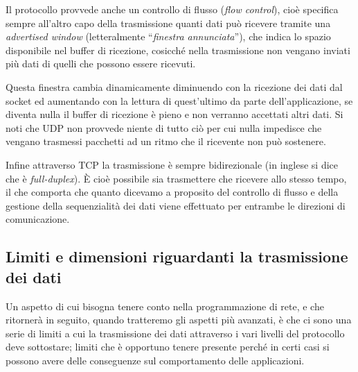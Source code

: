 
Il protocollo provvede anche un controllo di flusso (\textit{flow control}),
cioè specifica sempre all'altro capo della trasmissione quanti dati può
ricevere tramite una \textit{advertised window} (letteralmente
``\textsl{finestra annunciata}''), che indica lo spazio disponibile nel buffer
di ricezione, cosicché nella trasmissione non vengano inviati più dati di
quelli che possono essere ricevuti.

Questa finestra cambia dinamicamente diminuendo con la ricezione dei dati dal
socket ed aumentando con la lettura di quest'ultimo da parte
dell'applicazione, se diventa nulla il buffer di ricezione è pieno e non
verranno accettati altri dati.  Si noti che UDP non provvede niente di tutto
ciò per cui nulla impedisce che vengano trasmessi pacchetti ad un ritmo che il
ricevente non può sostenere.


Infine attraverso TCP la trasmissione è sempre bidirezionale (in inglese si
dice che è \textit{full-duplex}). È cioè possibile sia trasmettere che
ricevere allo stesso tempo, il che comporta che quanto dicevamo a proposito
del controllo di flusso e della gestione della sequenzialità dei dati viene
effettuato per entrambe le direzioni di comunicazione.


\subsection{Limiti e dimensioni riguardanti la trasmissione dei dati}
\label{sec:net_lim_dim}

Un aspetto di cui bisogna tenere conto nella programmazione di rete, e che
ritornerà in seguito, quando tratteremo gli aspetti più avanzati, è che ci sono
una serie di limiti a cui la trasmissione dei dati attraverso i vari livelli
del protocollo deve sottostare; limiti che è opportuno tenere presente perché
in certi casi si possono avere delle conseguenze sul comportamento delle
applicazioni.

